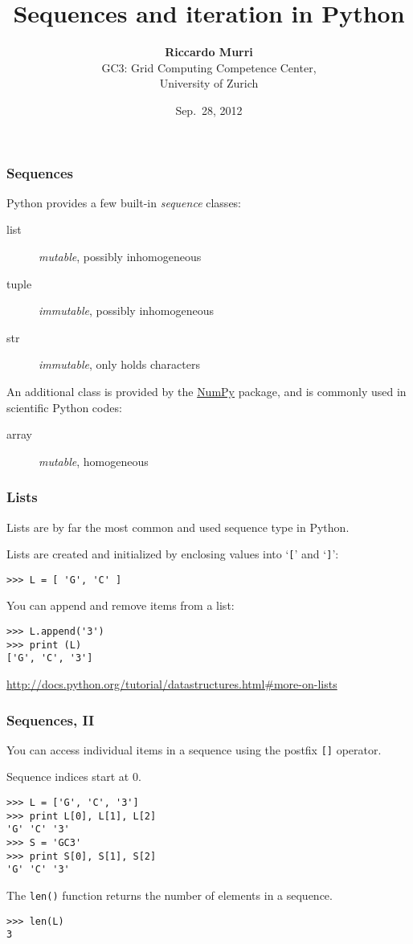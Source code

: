 \documentclass[english,serif,mathserif,xcolor=pdftex,dvipsnames,table]{beamer}
\title[Sequences, Iteration]{%
  Sequences and iteration in Python
}
\author[R. Murri]{%
  \textbf{Riccardo Murri} \\
  GC3: Grid Computing Competence Center, \\
  University of Zurich
}
\date{Sep.~28, 2012}
\begin{document}
\maketitle


\begin{frame}
  \frametitle{Sequences}
  
  Python provides a few built-in \emph{sequence} classes:
  \begin{description}
  \item[list] \emph{mutable}, possibly inhomogeneous
  \item[tuple] \emph{immutable}, possibly inhomogeneous
  \item[str] \emph{immutable}, only holds characters
  \end{description}
  An additional class is provided by the
  \href{http://numpy.scipy.org}{NumPy} package, and is commonly used in
  scientific Python codes:
  \begin{description}
  \item[array] \emph{mutable}, homogeneous
  \end{description}
\end{frame}


\begin{frame}[fragile]
  \frametitle{Lists}
  Lists are by far the most common and used sequence type in Python.

  \+ 
  Lists are created and initialized by enclosing values into
  `\texttt{[}' and `\texttt{]}':
\begin{lstlisting}
>>> L = [ 'G', 'C' ]
\end{lstlisting}

  \+
  You can append and remove items from a list:
\begin{lstlisting}
>>> L.append('3')
>>> print (L)
['G', 'C', '3']
\end{lstlisting}

  \+
  \begin{references}
    \url{http://docs.python.org/tutorial/datastructures.html#more-on-lists}
  \end{references}
\end{frame}


\begin{frame}
  \frametitle{Sequences, II}
  You can access individual items in a sequence using the postfix
  \texttt{[]} operator.

  \+
  Sequence indices start at 0.
\begin{lstlisting}
>>> L = ['G', 'C', '3']
>>> print L[0], L[1], L[2]
'G' 'C' '3'
>>> S = 'GC3'
>>> print S[0], S[1], S[2]
'G' 'C' '3'
\end{lstlisting}

  \+
  The \texttt{len()} function returns the number of elements in a
  sequence.
\begin{lstlisting}
>>> len(L)
3
\end{lstlisting}
\end{frame}
\end{document}
